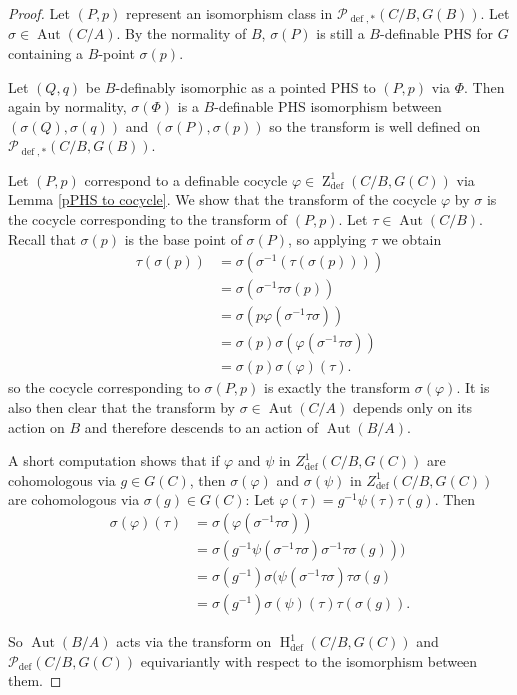 \documentclass{article}
\theoremstyle{problemstyle}
\DeclareMathOperator{\defin}{def} %
\DeclareMathOperator{\aut}{Aut} %
\DeclareMathOperator{\HH}{H} %
\DeclareMathOperator{\ZZ}{Z} %
\begin{document}
\begin{proof}
    Let $(P,p)$ represent an isomorphism class in $\mathcal{P}_{\defin,*}(C/B,G(B))$.  Let $\sigma \in \aut(C/A)$. By the normality of $B$, $\sigma(P)$ is still a $B$-definable PHS for $G$ containing a $B$-point $\sigma(p)$.

    Let $(Q,q)$ be $B$-definably isomorphic as a pointed PHS to $(P,p)$ via $\Phi$. Then again by normality, $\sigma(\Phi)$ is a $B$-definable PHS isomorphism between $(\sigma(Q),\sigma(q))$ and $(\sigma(P),\sigma(p))$ so the transform is well defined on $\mathcal{P}_{\defin,*}(C/B,G(B))$. 

    Let $(P,p)$ correspond to a definable cocycle $\varphi \in \ZZ^{1}_{\defin}(C/B,G(C))$ via Lemma \ref{pPHS to cocycle}. We show that the transform of the cocycle $\varphi$ by $\sigma$ is the cocycle corresponding to the transform of $(P,p)$. Let $\tau \in \aut(C/B)$. Recall that $\sigma(p)$ is the base point of $\sigma(P)$, so applying $\tau$ we obtain \begin{align*}\tau(\sigma(p)) &= \sigma(\sigma^{-1}(\tau(\sigma(p))))\\
    &= \sigma(\sigma^{-1}\tau\sigma(p))\\
    &= \sigma(p\varphi(\sigma^{-1}\tau\sigma))\\
    &= \sigma(p)\sigma(\varphi(\sigma^{-1}\tau\sigma))\\
    &= \sigma(p)\sigma(\varphi)(\tau).
    \end{align*}
so the cocycle corresponding to $\sigma(P,p)$ is exactly the transform $\sigma(\varphi)$. It is also then clear that the transform by $\sigma \in \aut(C/A)$ depends only on its action on $B$ and therefore descends to an action of $\aut(B/A)$.

A short computation shows that if $\varphi$ and $\psi$ in $Z^{1}_{\defin}(C/B,G(C))$ are cohomologous via $g \in G(C)$, then $\sigma(\varphi)$ and $\sigma(\psi)$ in $Z^{1}_{\defin}(C/B,G(C))$ are cohomologous via $\sigma(g) \in G(C)$: Let $\varphi(\tau) = g^{-1}\psi(\tau)\tau(g)$. Then \begin{align*}
    \sigma(\varphi)(\tau) &= \sigma(\varphi(\sigma^{-1}\tau\sigma))\\&= \sigma(g^{-1}\psi(\sigma^{-1}\tau\sigma)\sigma^{-1}\tau\sigma(g)))\\
    &= \sigma(g^{-1})\sigma(\psi(\sigma^{-1}\tau\sigma)\tau\sigma(g)\\
    &= \sigma(g^{-1})\sigma(\psi)(\tau)\tau(\sigma(g)).
\end{align*}  

So $\aut(B/A)$ acts via the transform on $\HH^1_{\defin}(C/B,G(C))$ and $\mathcal{P}_{\defin}(C/B,G(C))$ equivariantly with respect to the isomorphism between them.     
\end{proof}
\end{document}
